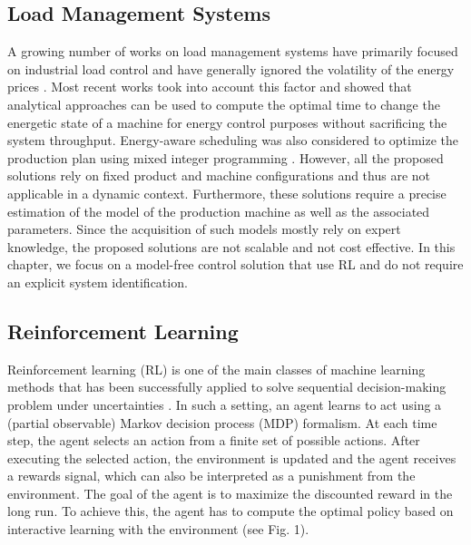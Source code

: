 \subsection{Load Management Systems}

A growing number of works on load management systems have primarily focused on industrial load control and have generally ignored the volatility of the energy prices \cite{Gholian7236921, CHEN2015263, Wang6345296, MIDDELBERG20091266}. Most recent works \cite{Sun6329376, DUFLOU2012587, Pechmann2011} took into account this factor and showed that analytical approaches can be used to compute the optimal time to change the energetic state of a machine for energy control purposes without sacrificing the system throughput. Energy-aware scheduling was also considered to optimize the production plan using mixed integer programming \cite{BRUZZONE2012459, FANG2011234}. However, all the proposed solutions rely on fixed product and machine configurations and thus are not applicable in a dynamic context. Furthermore, these solutions require a precise estimation of the model of the production machine as well as the associated parameters. Since the acquisition of such models mostly rely on expert knowledge, the proposed solutions are not scalable and not cost effective. In this chapter, we focus on a model-free control solution that use RL and do not require an explicit system identification.

\subsection{Reinforcement Learning}
Reinforcement learning (RL) is one of the main classes of machine learning methods that has been successfully applied to solve sequential decision-making problem under uncertainties \cite{Liu6918520}. In such a setting, an agent learns to act using a (partial observable) Markov decision process (MDP) \cite{Sutton9780262039246} formalism. At each time step, the agent selects an action from a finite set of possible actions. After executing the selected action, the environment is updated and the agent receives a rewards signal, which can also be interpreted as a punishment from the environment. The goal of the agent is to maximize the discounted reward in the long run. To achieve this, the agent has to compute the optimal policy based on interactive learning with the environment (see Fig. 1).

